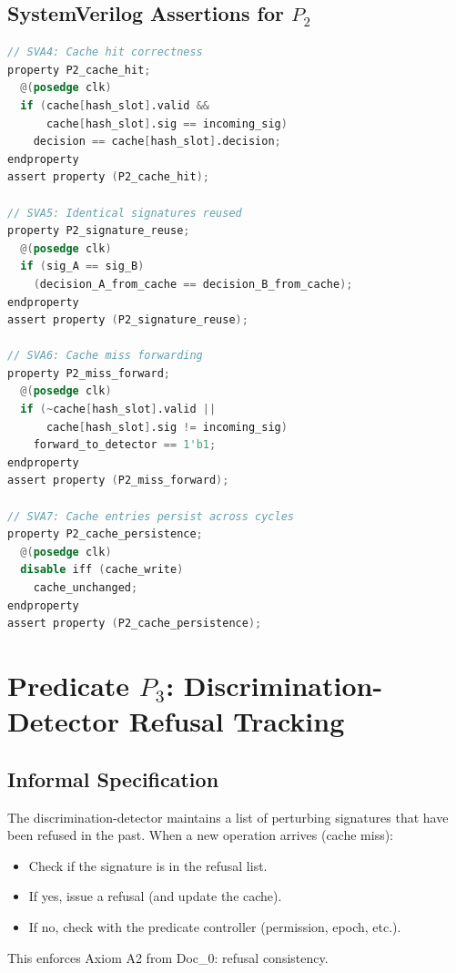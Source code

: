 \documentclass[11pt,oneside]{article}
\begin{document}
\subsection{SystemVerilog Assertions for $P_2$}

\begin{lstlisting}[language=Verilog]
// SVA4: Cache hit correctness
property P2_cache_hit;
  @(posedge clk) 
  if (cache[hash_slot].valid && 
      cache[hash_slot].sig == incoming_sig)
    decision == cache[hash_slot].decision;
endproperty
assert property (P2_cache_hit);

// SVA5: Identical signatures reused
property P2_signature_reuse;
  @(posedge clk)
  if (sig_A == sig_B)
    (decision_A_from_cache == decision_B_from_cache);
endproperty
assert property (P2_signature_reuse);

// SVA6: Cache miss forwarding
property P2_miss_forward;
  @(posedge clk)
  if (~cache[hash_slot].valid || 
      cache[hash_slot].sig != incoming_sig)
    forward_to_detector == 1'b1;
endproperty
assert property (P2_miss_forward);

// SVA7: Cache entries persist across cycles
property P2_cache_persistence;
  @(posedge clk)
  disable iff (cache_write)
    cache_unchanged;
endproperty
assert property (P2_cache_persistence);
\end{lstlisting}

\section{Predicate $P_3$: Discrimination-Detector Refusal Tracking}

\subsection{Informal Specification}

The discrimination-detector maintains a list of perturbing signatures that have been refused in the past. When a new operation arrives (cache miss):

\begin{itemize}
\item Check if the signature is in the refusal list.
\item If yes, issue a refusal (and update the cache).
\item If no, check with the predicate controller (permission, epoch, etc.).
\end{itemize}

This enforces Axiom A2 from Doc\_0: refusal consistency.
\end{document}
